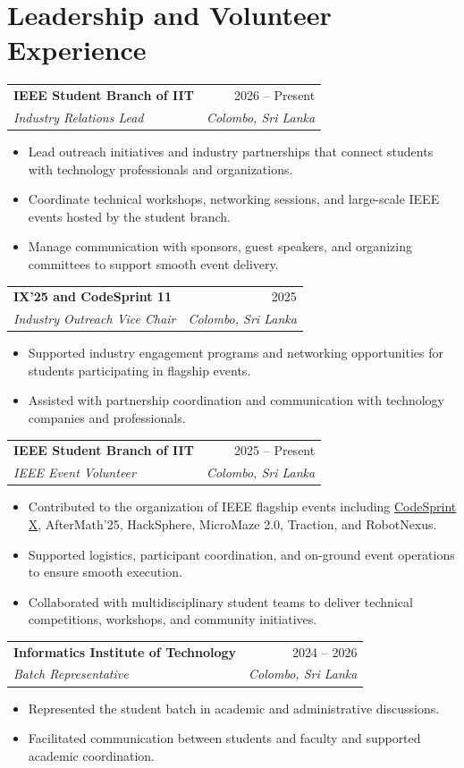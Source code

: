 \documentclass[letterpaper,10pt]{article}
\makeatletter
\newcommand{\resumeSubheading}[4]{
  \begin{tabular*}{\textwidth}{l@{\extracolsep{\fill}}r}
    \textbf{#1} & #2 \\
    \textit{#3} & \textit{#4} \\
  \end{tabular*}\vspace{-4pt}
}
\makeatother
\begin{document}
\section{Leadership and Volunteer Experience}
\resumeSubheading
  {IEEE Student Branch of IIT}{2026 -- Present}
  {Industry Relations Lead}{Colombo, Sri Lanka}
\begin{itemize}
  \item Lead outreach initiatives and industry partnerships that connect students with technology professionals and organizations.
  \item Coordinate technical workshops, networking sessions, and large-scale IEEE events hosted by the student branch.
  \item Manage communication with sponsors, guest speakers, and organizing committees to support smooth event delivery.
\end{itemize}

\resumeSubheading
  {IX'25 and CodeSprint 11}{2025}
  {Industry Outreach Vice Chair}{Colombo, Sri Lanka}
\begin{itemize}
  \item Supported industry engagement programs and networking opportunities for students participating in flagship events.
  \item Assisted with partnership coordination and communication with technology companies and professionals.
\end{itemize}

\resumeSubheading
  {IEEE Student Branch of IIT}{2025 -- Present}
  {IEEE Event Volunteer}{Colombo, Sri Lanka}
\begin{itemize}
  \item Contributed to the organization of IEEE flagship events including \href{https://ieeeiit.org}{CodeSprint X}, AfterMath'25, HackSphere, MicroMaze 2.0, Traction, and RobotNexus.
  \item Supported logistics, participant coordination, and on-ground event operations to ensure smooth execution.
  \item Collaborated with multidisciplinary student teams to deliver technical competitions, workshops, and community initiatives.
\end{itemize}

\resumeSubheading
  {Informatics Institute of Technology}{2024 -- 2026}
  {Batch Representative}{Colombo, Sri Lanka}
\begin{itemize}
  \item Represented the student batch in academic and administrative discussions.
  \item Facilitated communication between students and faculty and supported academic coordination.
\end{itemize}
\end{document}
